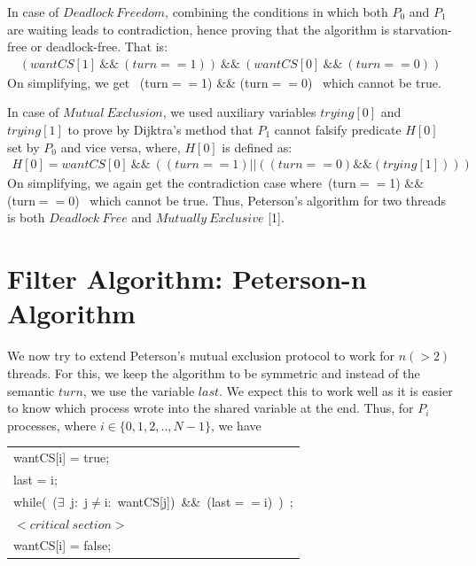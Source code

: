 \documentclass[twoside]{article}
\renewcommand{\cite}[1]{[#1]}
\begin{document}
In case of $Deadlock\ Freedom$, combining the conditions in which both $P_0$ and $P_1$ are waiting leads to contradiction, hence proving that the algorithm is starvation-free or deadlock-free. That is:
\begin{align*}
    (wantCS[1]\ \&\&\ (turn==1))\ \&\&\ (wantCS[0]\ \&\&\ (turn==0))
\end{align*}
On simplifying, we get \ (turn$==$1) \&\& (turn$==$0) \ which cannot be true.

In case of $Mutual\ Exclusion$, we used auxiliary variables $trying[0]$ and $trying[1]$ to prove by Dijktra's method that $P_1$ cannot falsify predicate $H[0]$ set by $P_0$ and vice versa, where, $H[0]$ is defined as:
\begin{align*}
    H[0] = wantCS[0]\ \&\&\ ( (turn==1) || ((turn==0)\&\&(trying[1])))
\end{align*}
On simplifying, we again get the contradiction case where\ (turn$==$1) \&\& (turn$==$0) \ which cannot be true. Thus, Peterson's algorithm for two threads is both $Deadlock\ Free$ and $Mutually\ Exclusive$ \cite{1}.



\section{Filter Algorithm: Peterson-n Algorithm}
We now try to extend Peterson's mutual exclusion protocol to work for $n(>2)$ threads. For this, we keep the algorithm to be symmetric and instead of the semantic $turn$, we use the variable $last$. We expect this to work well as it is easier to know which process wrote into the shared variable at the end.
Thus, for $P_i$ processes, where $i\in\{0,1,2,..,N-1\}$, we have

\begin{table}[ht]
    \centering
    \begin{tabular}{l}
       wantCS[i] = true;                                     
    \\ last = i;                                              
    \\ while(\ ($\exists$\ j:\ j$\neq$i:\ wantCS[j])\ \&\&\ (last$==$i)\ )\ ;    
    \\ $< critical\ section >$                                            
    \\ wantCS[i] = false;                                       
    \end{tabular}
\end{table} 
\end{document}
